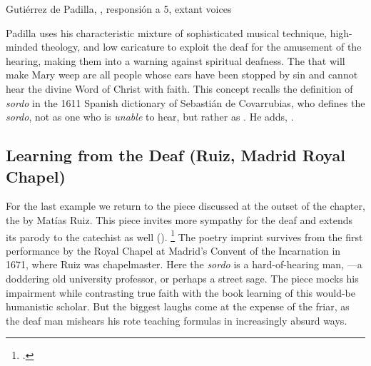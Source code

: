 \begin{musicexample}
    \caption{Gutiérrez de Padilla, ,
    responsión a 5, extant voices}

    \label{music:Padilla-Sordo-responsion}
\end{musicexample}

Padilla uses his characteristic mixture of sophisticated musical technique,
high-minded theology, and low caricature to exploit the deaf for the amusement
of the hearing, making them into a warning against spiritual deafness.
The  that will make Mary weep are all people whose ears have
been stopped by sin and cannot hear the divine Word of Christ with faith.
This concept recalls the definition of \emph{sordo} in the 1611 Spanish
dictionary of Sebastián de Covarrubias, who defines the \emph{sordo}, not as one
who is \emph{unable} to hear, but rather as .
He adds, .%
    \Autocite
    [: .] 
    {Covarrubias:Tesoro}


\subsection{Learning from the Deaf (Ruiz, Madrid Royal Chapel)}

For the last example we return to the piece discussed at the outset of the
chapter, the  by Matías Ruiz.
This piece invites more sympathy for the deaf and extends its parody to the
catechist as well
().%
    \footnote{.}
The poetry imprint survives from the first performance by the Royal Chapel at
Madrid's Convent of the Incarnation in 1671, where Ruiz was chapelmaster.%
   \Autocites{1671-Madrid-Enc-Nav}{Grove:Ruiz}
Here the \emph{sordo} is a hard-of-hearing man, ---a doddering old university professor, or perhaps a street sage.
The piece mocks his impairment while contrasting true faith with the book
learning of this would-be humanistic scholar.
But the biggest laughs come at the expense of the friar, as the deaf man
mishears his rote teaching formulas in increasingly absurd ways.

